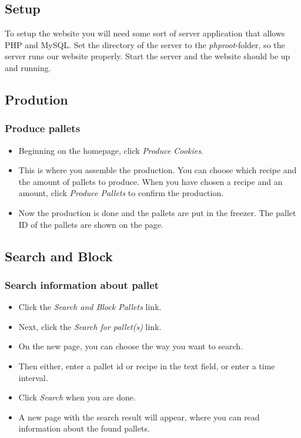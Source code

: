 \documentclass[a4paper]{article}
\begin{document}
\subsection{Setup}
To setup the website you will need some sort of server application that allows PHP and MySQL. Set the directory of the server to the \emph{phproot}-folder, so the server runs our website properly. Start the server and the website should be up and running.
\subsection{Prodution}
\subsubsection{Produce pallets}
\begin{itemize}
  \item Beginning on the homepage, click \emph{Produce Cookies}.
  \item This is where you assemble the production. You can choose which recipe and the amount of pallets to produce. When you have chosen a recipe and an amount, click \emph{Produce Pallets} to confirm the production.
  \item Now the production is done and the pallets are put in the freezer. The pallet ID of the pallets are shown on the page.
\end{itemize}

\subsection{Search and Block}
\subsubsection{Search information about pallet}
\begin{itemize}
	\item Click the \emph{Search and Block Pallets} link.
	\item Next, click the \emph{Search for pallet(s)} link.
	\item On the new page, you can choose the way you want to search.
	\item Then either, enter a pallet id or recipe in the text field, or enter a time interval.
	\item Click \emph{Search} when you are done.
	\item A new page with the search result will appear, where you can read information about the found pallets.
\end{itemize}
\end{document}
